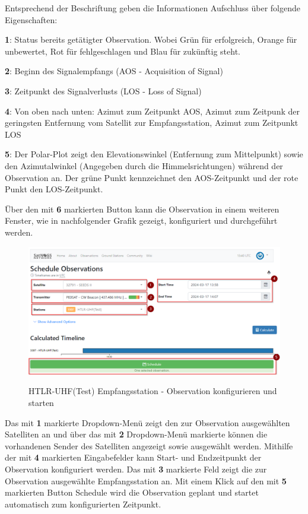 Entsprechend der Beschriftung geben die Informationen Aufschluss über folgende Eigenschaften:

\textbf{1}: Status bereits getätigter Observation. Wobei Grün für erfolgreich, Orange für unbewertet, Rot für fehlgeschlagen und Blau für zukünftig steht.\newline

\textbf{2}: Beginn des Signalempfangs (AOS - Acquisition of Signal) \newline

\textbf{3}: Zeitpunkt des Signalverlusts (LOS - Loss of Signal) \newline

\textbf{4}: Von oben nach unten: Azimut zum Zeitpunkt AOS, Azimut zum Zeitpunk der geringsten Entfernung vom Satellit zur Empfangsstation, Azimut zum Zeitpunkt LOS \newline

\textbf{5}: Der Polar-Plot zeigt den Elevationswinkel (Entfernung zum Mittelpunkt) sowie den Azimutalwinkel (Angegeben durch die Himmelsrichtungen) während der Observation an. Der grüne Punkt kennzeichnet den AOS-Zeitpunkt und der rote Punkt den LOS-Zeitpunkt.

Über den mit \textbf{6} markierten Button kann die Observation in einem weiteren Fenster, wie in nachfolgender Grafik gezeigt, konfiguriert und durchgeführt werden.

\begin{figure} [H]
	\centering
	\includegraphics[width=\linewidth]{../ref/schedule_observation_schedule.png}
	\caption{HTLR-UHF(Test) Empfangsstation - Observation konfigurieren und starten} \cite{noauthor_satnogs_nodate}
	\label{fig:htrl-uhf(test)configureobservation}
\end{figure}

Das mit \textbf{1} markierte Dropdown-Menü zeigt den zur Observation ausgewählten Satelliten an und über das mit \textbf{2} Dropdown-Menü markierte können die vorhandenen Sender des Satelliten angezeigt sowie ausgewählt werden. Mithilfe der mit \textbf{4} markierten Eingabefelder kann Start- und Endzeitpunkt der Observation konfiguriert werden. Das mit \textbf{3} markierte Feld zeigt die zur Observation ausgewählte Empfangsstation an. Mit einem Klick auf den mit \textbf{5} markierten Button \glqq Schedule\grqq{} wird die Observation geplant und startet automatisch zum konfigurierten Zeitpunkt.

